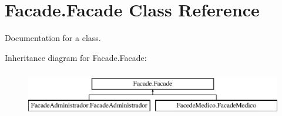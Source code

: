 \hypertarget{class_facade_1_1_facade}{}\section{Facade.\+Facade Class Reference}
\label{class_facade_1_1_facade}


Documentation for a class.  


Inheritance diagram for Facade.\+Facade\+:\begin{figure}[H]
\begin{center}
\leavevmode
\includegraphics[height=2.000000cm]{class_facade_1_1_facade}
\end{center}
\end{figure}
